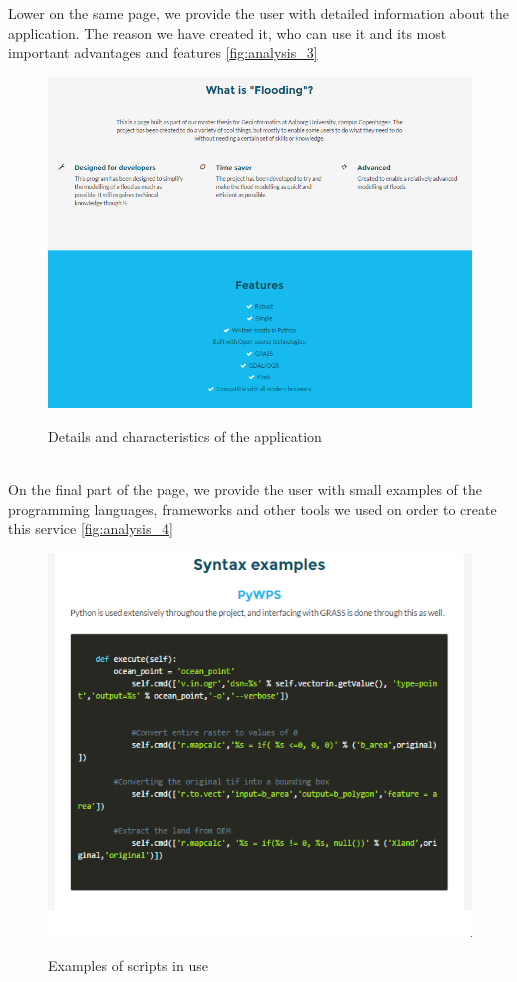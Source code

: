 Lower on the same page, we provide the user with detailed information about the application. The reason we have created it, who can use it and its most important advantages and features \autoref{fig:analysis_3}


\begin{figure}[h!]
\centering
	{\includegraphics[width=0.75\linewidth]{gfx/Analysis_Website/3.png}}
\caption{Details and characteristics of the application}
\label{fig:analysis_3}
\end{figure}\\

On the final part of the page, we provide the user with small examples of the programming languages, frameworks and other tools we used on order to create this service 
\autoref{fig:analysis_4}

\begin{figure}[h!]
\centering
	{\includegraphics[width=0.75\linewidth]{gfx/Analysis_Website/4.png}}
\caption{Examples of scripts in use}
\label{fig:analysis_4}
\end{figure}

